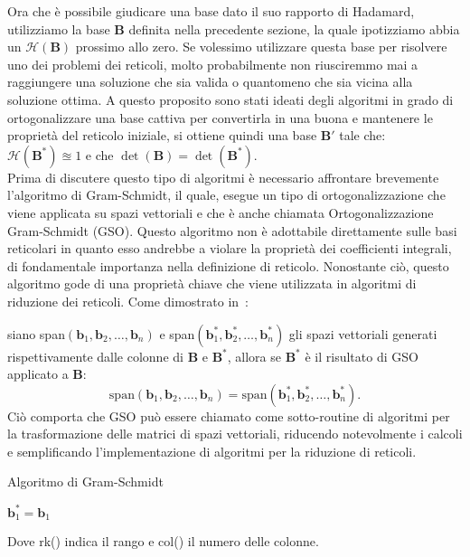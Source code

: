 Ora che è possibile giudicare una base dato il suo rapporto di Hadamard, utilizziamo la base
$\mathbf{B}$ definita nella precedente sezione, la quale ipotizziamo abbia un 
$\mathcal{H}(\mathbf{B})$ prossimo allo zero. Se volessimo utilizzare questa base per risolvere
uno dei problemi dei reticoli, molto probabilmente non riusciremmo mai a raggiungere una soluzione
che sia valida o quantomeno che sia vicina alla soluzione ottima.
A questo proposito sono stati ideati degli algoritmi in grado di ortogonalizzare una base
cattiva per convertirla in una buona e mantenere le proprietà del reticolo iniziale, si
ottiene quindi una base $\mathbf{B'}$ tale che: 
$\mathcal{H}(\mathbf{B}^*) \approxeq 1$ e che $\det(\mathbf{B}) = \det(\mathbf{B}^*)$.
\\
Prima di discutere questo tipo di algoritmi è necessario affrontare brevemente 
l'algoritmo di Gram-Schmidt, il quale, esegue un tipo di ortogonalizzazione che viene applicata
su spazi vettoriali e che è anche chiamata Ortogonalizzazione Gram-Schmidt (GSO).
Questo algoritmo non è adottabile direttamente sulle basi reticolari in quanto esso andrebbe a 
violare la proprietà dei coefficienti integrali, di fondamentale importanza nella
definizione di reticolo. Nonostante ciò, questo algoritmo gode di una proprietà chiave che
viene utilizzata in algoritmi di riduzione dei reticoli. Come dimostrato in~\cite[Teorema 7.13]{HDMRD08}:

siano span$(\mathbf{b}_1, \mathbf{b}_2, \dots, \mathbf{b}_n)$ e 
span$(\mathbf{b}_1^*, \mathbf{b}_2^*, \dots, \mathbf{b}_n^*)$ 
gli spazi vettoriali generati rispettivamente dalle colonne di $\mathbf{B}$ e $\mathbf{B}^*$,
allora se $\mathbf{B}^*$ è il risultato di GSO applicato a $\mathbf{B}$:
\[
\text{span}(\mathbf{b}_1, \mathbf{b}_2, \dots, \mathbf{b}_n) =
\text{span}(\mathbf{b}_1^*, \mathbf{b}_2^*, \dots, \mathbf{b}_n^*).
\]
Ciò comporta che GSO può essere chiamato come sotto-routine di algoritmi per la trasformazione
delle matrici di spazi vettoriali, riducendo notevolmente i calcoli e semplificando l'implementazione
di algoritmi per la riduzione di reticoli.

\begin{algorithm}
    \caption{Algoritmo di Gram-Schmidt}
    \label{alg:one}
    \large
    \DontPrintSemicolon
    $\mathbf{b}_1^* = \mathbf{b}_1$\;
\end{algorithm}
Dove rk() indica il rango e col() il numero delle colonne. 

